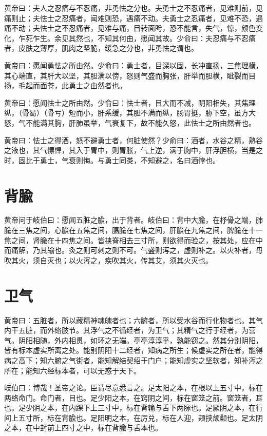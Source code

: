 \documentclass[a4paper,12pt,UTF8,twoside]{ctexbook}
\begin{document}
	黄帝曰：夫人之忍痛与不忍痛，非勇怯之分也。夫勇士之不忍痛者，见难则前，见痛则止；夫怯士之忍痛者，闻难则恐，遇痛不动。夫勇士之忍痛者，见难不恐，遇痛不动；夫怯士之不忍痛者，见难与痛，目转面盻，恐不能言，失气，惊，颜色变化，乍死乍生。余见其然也，不知其何由，愿闻其故。少俞曰：夫忍痛与不忍痛者，皮肤之薄厚，肌肉之坚脆，缓急之分也，非勇怯之谓也。
	
	黄帝曰：愿闻勇怯之所由然。少俞曰：勇士者，目深以固，长冲直扬，三焦理横，其心端直，其肝大以坚，其胆满以傍，怒则气盛而胸张，肝举而胆横，眦裂而目扬，毛起而面苍，此勇士之由然者也。
	
	黄帝曰：愿闻怯士之所由然。少俞曰：怯士者，目大而不减，阴阳相失，其焦理纵，（骨曷）（骨亏）短而小，肝系缓，其胆不满而纵，肠胃挺，胁下空，虽方大怒，气不能满其胸，肝肺虽举，气衰复下，故不能久怒，此怯士之所由然者也。
	
	黄帝曰：怯士之得酒，怒不避勇士者，何脏使然？少俞曰：酒者，水谷之精，熟谷之液也，其气慓悍，其入于胃中，则胃胀，气上逆，满于胸中，肝浮胆横，当是之时，固比于勇士，气衰则悔。与勇士同类，不知避之，名曰酒悖也。
	\chapter{背腧}
	
	黄帝问于岐伯曰：愿闻五脏之腧，出于背者。岐伯曰：背中大腧，在杼骨之端，肺腧在三焦之间，心腧在五焦之间，膈腧在七焦之间，肝腧在九焦之间，脾腧在十一焦之间，肾腧在十四焦之间。皆挟脊相去三寸所，则欲得而验之，按其处，应在中而痛解，乃其输也。灸之则可刺之则不可。气盛则泻之，虚则补之。以火补者，毋吹其火，须自灭也；以火泻之，疾吹其火，传其艾，须其火灭也。
	\chapter{卫气}
	
	黄帝曰：五脏者，所以藏精神魂魄者也；六腑者，所以受水谷而行化物者也。其气内干五脏，而外络肢节。其浮气之不循经者，为卫气；其精气之行于经者，为营气。阴阳相随，外内相贯，如环之无端。亭亭淳淳乎，孰能窃之。然其分别阴阳，皆有标本虚实所离之处。能别阴阳十二经者，知病之所生；候虚实之所在者，能得病之高下；知六腑之气街者，能知解结契绍于门户；能知虚实之坚软者，知补泻之所在；能知六经标本者，可以无惑于天下。
	
	岐伯曰：博哉！圣帝之论。臣请尽意悉言之。足太阳之本，在根以上五寸中，标在两络命门。命门者，目也。足少阳之本，在窍阴之间，标在窗笼之前。窗笼者，耳也。足少阴之本，在内踝下上三寸中，标在背输与舌下两脉也。足厥阴之本，在行间上五寸所，标在背腧也。足阳明之本，在厉兑，标在人迎，颊挟颃颡也。足太阴之本，在中封前上四寸之中，标在背腧与舌本也。
	
\end{document}
